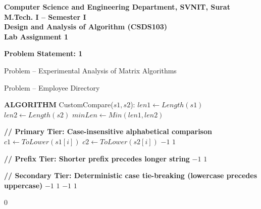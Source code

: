 \documentclass[12pt]{article}
\begin{document}

\begin{center}
\textbf{Computer Science and Engineering Department, SVNIT, Surat}\\
\textbf{M.Tech. I -- Semester I}\\
\textbf{Design and Analysis of Algorithm (CSDS103)}\\
\textbf{Lab Assignment 1}
\end{center}

\vspace{0.4cm}


\textbf{Problem Statement: 1}


Problem – Experimental Analysis of Matrix Algorithms

Problem – Employee Directory

\vspace{0.3cm}


\begin{algorithm}[H]
\caption{CustomCompare}
\begin{algorithmic}[1]
\State \textbf{ALGORITHM} CustomCompare($s1, s2$):
    \State $len1 \gets Length(s1)$
    \State $len2 \gets Length(s2)$
    \State $minLen \gets Min(len1, len2)$

    \State \textbf{// Primary Tier: Case-insensitive alphabetical comparison}
        \State $c1 \gets ToLower(s1[i])$
        \State $c2 \gets ToLower(s2[i])$
            \State \Return $-1$
            \State \Return $1$
        \EndIf
    \EndFor

    \State \textbf{// Prefix Tier: Shorter prefix precedes longer string}
        \State \Return $-1$
        \State \Return $1$
    \EndIf

    \State \textbf{// Secondary Tier: Deterministic case tie-breaking (lowercase precedes uppercase)}
                \State \Return $-1$
                \State \Return $1$
                \State \Return $-1$
            \Else
                \State \Return $1$
            \EndIf
        \EndIf
    \EndFor

    \State \Return $0$
\end{algorithmic}
\end{algorithm}
\end{document}
